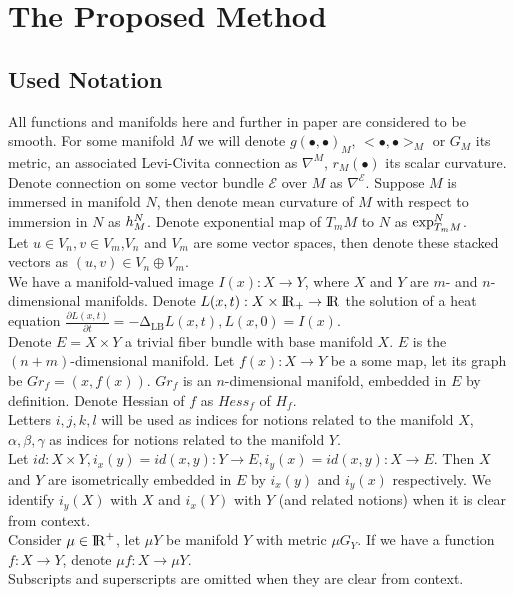 \documentclass{llncs}
\newcommand{\LaplaceBeltrami}{\mathrm{\Delta_{{LB}}}}
\newcommand{\partderiv}[2]{\frac{\partial #1}{\partial #2}}
\newcommand{\toreal}{\rightarrow\bbbr}
\newcommand{\CovariantDiffManif}[1]{\nabla^{#1}}
\newcommand{\TangentSpaceArg}[2]{{T_{#2}}{#1}}
\newcommand {\bigeps}{\mathcal{E}}
\begin{document}
\section{The Proposed Method}
\subsection{Used Notation}
All functions and manifolds here and further in paper are considered to be smooth. For some manifold $M$ we will denote $g(∙,∙)_{M}$, $<∙,∙>_{M}$ or $G_M$ its metric, an associated Levi-Civita connection as $\CovariantDiffManif{M}$, $r_M(∙)$ its scalar curvature. Denote connection on some vector bundle $\bigeps$ over $M$ as $\CovariantDiffManif{\bigeps}$. Suppose $M$ is immersed in manifold $N$, then denote mean curvature of $M$ with respect to immersion in $N$ as $\tensor*{h}{^{N}_{M}}$. Denote exponential map of $\TangentSpaceArg{M}{m}$ to $N$ as $\tensor*{\exp}{^N_{\TangentSpaceArg{M}{m}}}$.
\\
Let $u \in V_n, v \in V_m$,$V_n$ and $V_m$ are some vector spaces, then denote these stacked vectors as $(u,v) \in V_n\oplus V_m$.
\\ 
We have a manifold-valued image $I(x):X \to Y$, where $X$ and $Y$ are $m$- and $n$-dimensional manifolds. Denote $L(x,t):X\times \bbbr_{+} \toreal$ the solution of a heat equation $\partderiv{L(x, t)}{t}=-\LaplaceBeltrami{ L(x, t)},L(x, 0)=I(x)$. 
\\
Denote $E=X\times Y$ a  trivial fiber bundle with base manifold $X$. $E$ is the $(n+m)$-dimensional manifold. Let $f(x):X\to Y$ be a some map, let its graph be $Gr_f=(x,f(x))$. $Gr_f$ is an $n$-dimensional manifold, embedded in $E$ by definition. Denote Hessian of $f$ as $Hess_f$ of $H_f$.
\\
Letters $i,j,k,l$ will be used as indices for notions related to the manifold $X$, $\alpha, \beta, \gamma$ as indices for notions related to the manifold $Y$.
\\
Let $id:X\times Y, i_x(y)=id(x, y):Y\to E, i_y(x)=id(x, y):X\to E$. Then $X$ and $Y$ are isometrically embedded in $E$ by $i_x(y)$ and $i_y(x)$ respectively. We identify $i_y(X)$ with $X$ and $i_x(Y)$ with $Y$ (and related notions) when it is clear from context.
\\
Consider $\mu \in {\rm I\!R}^{+}$, let $\mu Y$ be manifold $Y$ with metric $\mu G_Y$. If we have a function $f:X\to Y$, denote $\mu f:X\to \mu Y$.
\\
Subscripts and superscripts are omitted when they are clear from context.
\end{document}

